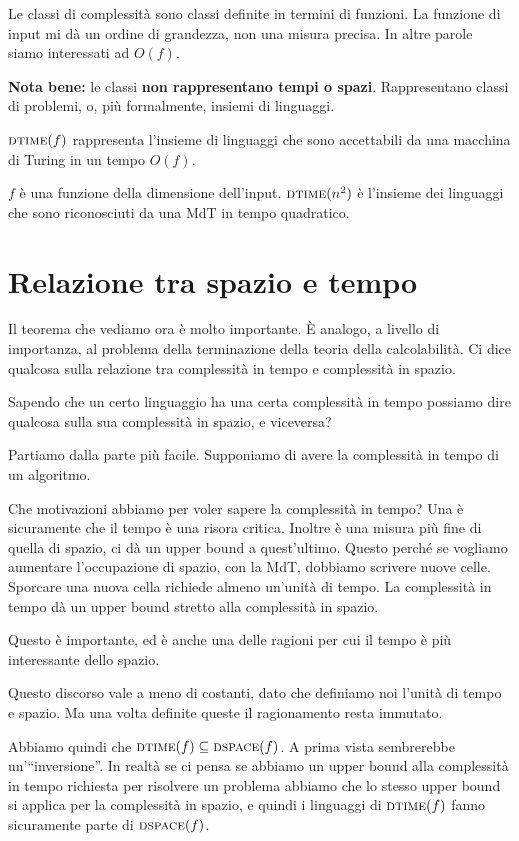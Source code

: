 Le classi di complessità sono classi definite in termini di funzioni. La funzione di input mi dà
un ordine di grandezza, non una misura precisa. In altre parole siamo interessati ad $O(f)$.

\textbf{Nota bene:} le classi \textbf{non rappresentano tempi o spazi}. Rappresentano classi di
problemi, o, più formalmente, insiemi di linguaggi.

$\textsc{dtime}(f)$ rappresenta l'insieme di linguaggi che sono accettabili da una macchina di Turing in un
tempo $O(f)$.

$f$ è una funzione della dimensione dell'input. $\textsc{dtime}(n^{2})$ è l'insieme dei linguaggi che sono
riconosciuti da una MdT in tempo quadratico.

\section{Relazione tra spazio e tempo}

Il teorema che vediamo ora è molto importante. È analogo, a livello di importanza, al problema
della terminazione della teoria della calcolabilità. Ci dice qualcosa sulla relazione tra
complessità in tempo e complessità in spazio.

Sapendo che un certo linguaggio ha una certa complessità in tempo possiamo dire qualcosa sulla sua
complessità in spazio, e viceversa?

Partiamo dalla parte più facile. Supponiamo di avere la complessità in tempo di un algoritmo.

Che motivazioni abbiamo per voler sapere la complessità in tempo? Una è sicuramente che il tempo è
una risora critica. Inoltre è una misura più fine di quella di spazio, ci dà un upper bound a
quest'ultimo. Questo perché se vogliamo aumentare l'occupazione di spazio, con la MdT, dobbiamo
scrivere nuove celle. Sporcare una nuova cella richiede almeno un'unità di tempo. La complessità in
tempo dà un upper bound stretto alla complessità in spazio.

Questo è importante, ed è anche una delle ragioni per cui il tempo è più interessante dello
spazio.

Questo discorso vale a meno di costanti, dato che definiamo noi l'unità di tempo e spazio. Ma una
volta definite queste il ragionamento resta immutato.

Abbiamo quindi che $\textsc{dtime}(f) \subseteq \textsc{dspace}(f)$. A prima vista sembrerebbe un'``inversione''. In
realtà se ci pensa se abbiamo un upper bound alla complessità in tempo richiesta per risolvere un
problema abbiamo che lo stesso upper bound si applica per la complessità in spazio, e quindi i
linguaggi di $\textsc{dtime}(f)$ fanno sicuramente parte di $\textsc{dspace}(f)$.

